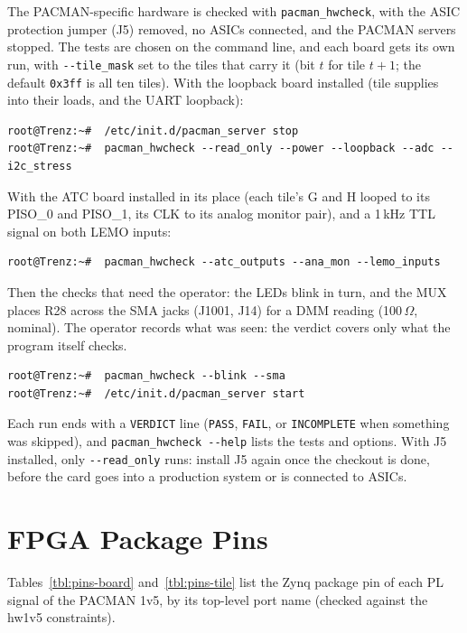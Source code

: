 \documentclass[12pt]{article}
\newcommand{\hex}[1]{\texttt{0x#1}}
\begin{document}
The PACMAN-specific hardware is checked with \texttt{pacman\_hwcheck}, with the ASIC protection jumper (J5)
removed, no ASICs connected, and the PACMAN servers stopped.  The tests are chosen on the command line, and each
board gets its own run, with \texttt{-{}-tile\_mask} set to the tiles that carry it (bit $t$ for tile $t+1$;  the
default \hex{3ff} is all ten tiles).  With the loopback board installed (tile supplies into their loads, and the
UART loopback):
\begin{lstlisting}[frame=leftline]
root@Trenz:~#  /etc/init.d/pacman_server stop
root@Trenz:~#  pacman_hwcheck --read_only --power --loopback --adc --i2c_stress
\end{lstlisting}
With the ATC board installed in its place (each tile's G and H looped to its PISO\_0 and PISO\_1, its CLK
to its analog monitor pair), and a 1\,kHz TTL signal on both LEMO inputs:
\begin{lstlisting}[frame=leftline]
root@Trenz:~#  pacman_hwcheck --atc_outputs --ana_mon --lemo_inputs
\end{lstlisting}
Then the checks that need the operator:  the LEDs blink in turn, and the MUX places R28 across the SMA jacks
(J1001, J14) for a DMM reading (100\,$\Omega$, nominal).  The operator records what was seen:  the verdict covers
only what the program itself checks.
\begin{lstlisting}[frame=leftline]
root@Trenz:~#  pacman_hwcheck --blink --sma
root@Trenz:~#  /etc/init.d/pacman_server start
\end{lstlisting}
Each run ends with a \texttt{VERDICT} line (\texttt{PASS}, \texttt{FAIL}, or \texttt{INCOMPLETE} when something was
skipped), and \texttt{pacman\_hwcheck -{}-help} lists the tests and options.  With J5 installed, only
\texttt{-{}-read\_only} runs:  install J5 again once the checkout is done, before the card goes into a production
system or is connected to ASICs.

\appendix

\newpage
\section{FPGA Package Pins}\label{sec:pins}

Tables~\ref{tbl:pins-board} and~\ref{tbl:pins-tile} list the Zynq package pin of each PL signal of the PACMAN 1v5,
by its top-level port name (checked against the hw1v5 constraints).
\end{document}
